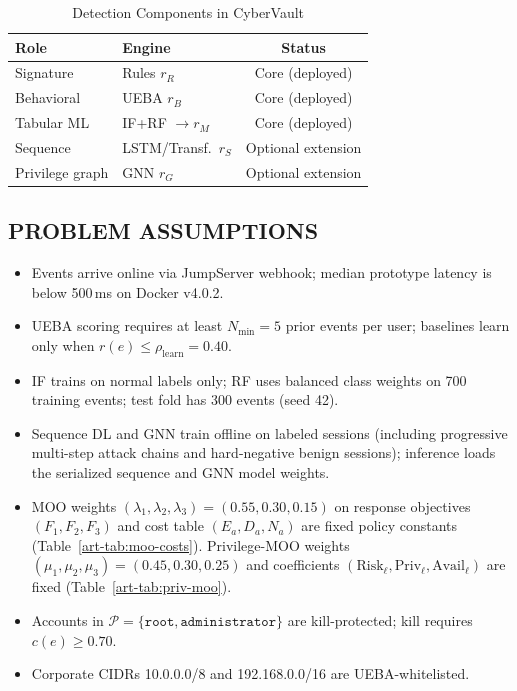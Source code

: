 \begin{table}[H]
\caption{Detection Components in CyberVault}
\label{art-tab:deployed-scope}
\centering
\scriptsize
\begin{tabular}{@{}ll c@{}}
\toprule
\textbf{Role} & \textbf{Engine} & \textbf{Status} \\
\midrule
Signature & Rules $r_R$ & Core (deployed) \\
Behavioral & UEBA $r_B$ & Core (deployed) \\
Tabular ML & IF+RF $\rightarrow r_M$ & Core (deployed) \\
Sequence & LSTM/Transf.\ $r_S$ & Optional extension \\
Privilege graph & GNN $r_G$ & Optional extension \\
\bottomrule
\end{tabular}
\end{table}

\subsection{PROBLEM ASSUMPTIONS}
\begin{itemize}
\item Events arrive online via JumpServer webhook; median prototype latency is below 500\,ms on Docker v4.0.2.
\item UEBA scoring requires at least $N_{\min}=5$ prior events per user; baselines learn only when $r(e)\leq\rho_{\mathrm{learn}}=0.40$.
\item IF trains on normal labels only; RF uses balanced class weights on 700 training events; test fold has 300 events (seed 42).
\item Sequence DL and GNN train offline on labeled sessions (including progressive multi-step attack chains and hard-negative benign sessions); inference loads the serialized sequence and GNN model weights.
\item MOO weights $(\lambda_1,\lambda_2,\lambda_3)=(0.55,0.30,0.15)$ on response objectives $(F_1,F_2,F_3)$ and cost table $(E_a,D_a,N_a)$ are fixed policy constants (Table~\ref{art-tab:moo-costs}). Privilege-MOO weights $(\mu_1,\mu_2,\mu_3)=(0.45,0.30,0.25)$ and coefficients $(\mathrm{Risk}_{\ell},\mathrm{Priv}_{\ell},\mathrm{Avail}_{\ell})$ are fixed (Table~\ref{art-tab:priv-moo}).
\item Accounts in $\mathcal{P}=\{\texttt{root},\texttt{administrator}\}$ are kill-protected; kill requires $c(e)\geq 0.70$.
\item Corporate CIDRs 10.0.0.0/8 and 192.168.0.0/16 are UEBA-whitelisted.
\end{itemize}


